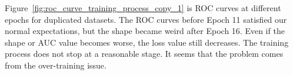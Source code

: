 \documentclass[12pt]{article}
\begin{document}
			Figure~\ref{fig:roc_curve_training_process_copy_1} is ROC curves at different epochs for duplicated datasets. The ROC curves before Epoch 11 satisfied our normal expectations, but the shape became weird after Epoch 16. Even if the shape or AUC value becomes worse, the loss value still decreases. The training process does not stop at a reasonable stage. It seems that the problem comes from the over-training issue.
			\begin{figure}[htpb]
				\centering
				 \\ 
\end{figure}
\end{document}
